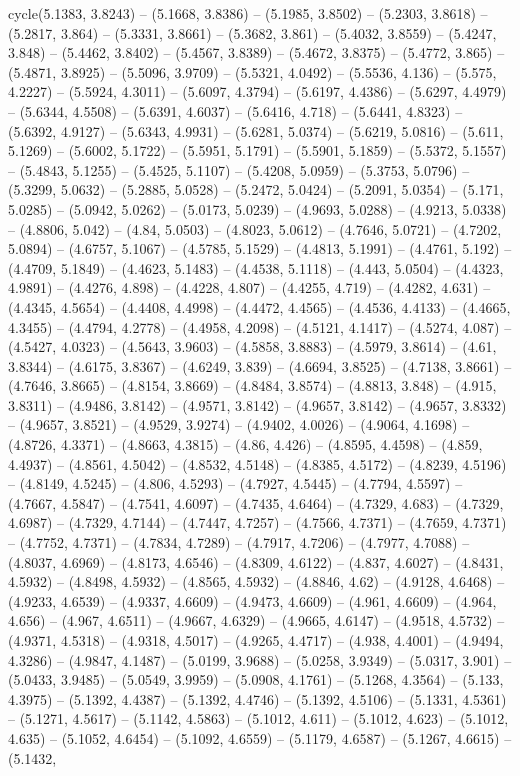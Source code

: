 cycle(5.1383, 3.8243) -- (5.1668, 3.8386) -- (5.1985, 3.8502) -- (5.2303, 3.8618) -- (5.2817, 3.864) -- (5.3331, 3.8661) -- (5.3682, 3.861) -- (5.4032, 3.8559) -- (5.4247, 3.848) -- (5.4462, 3.8402) -- (5.4567, 3.8389) -- (5.4672, 3.8375) -- (5.4772, 3.865) -- (5.4871, 3.8925) -- (5.5096, 3.9709) -- (5.5321, 4.0492) -- (5.5536, 4.136) -- (5.575, 4.2227) -- (5.5924, 4.3011) -- (5.6097, 4.3794) -- (5.6197, 4.4386) -- (5.6297, 4.4979) -- (5.6344, 4.5508) -- (5.6391, 4.6037) -- (5.6416, 4.718) -- (5.6441, 4.8323) -- (5.6392, 4.9127) -- (5.6343, 4.9931) -- (5.6281, 5.0374) -- (5.6219, 5.0816) -- (5.611, 5.1269) -- (5.6002, 5.1722) -- (5.5951, 5.1791) -- (5.5901, 5.1859) -- (5.5372, 5.1557) -- (5.4843, 5.1255) -- (5.4525, 5.1107) -- (5.4208, 5.0959) -- (5.3753, 5.0796) -- (5.3299, 5.0632) -- (5.2885, 5.0528) -- (5.2472, 5.0424) -- (5.2091, 5.0354) -- (5.171, 5.0285) -- (5.0942, 5.0262) -- (5.0173, 5.0239) -- (4.9693, 5.0288) -- (4.9213, 5.0338) -- (4.8806, 5.042) -- (4.84, 5.0503) -- (4.8023, 5.0612) -- (4.7646, 5.0721) -- (4.7202, 5.0894) -- (4.6757, 5.1067) -- (4.5785, 5.1529) -- (4.4813, 5.1991) -- (4.4761, 5.192) -- (4.4709, 5.1849) -- (4.4623, 5.1483) -- (4.4538, 5.1118) -- (4.443, 5.0504) -- (4.4323, 4.9891) -- (4.4276, 4.898) -- (4.4228, 4.807) -- (4.4255, 4.719) -- (4.4282, 4.631) -- (4.4345, 4.5654) -- (4.4408, 4.4998) -- (4.4472, 4.4565) -- (4.4536, 4.4133) -- (4.4665, 4.3455) -- (4.4794, 4.2778) -- (4.4958, 4.2098) -- (4.5121, 4.1417) -- (4.5274, 4.087) -- (4.5427, 4.0323) -- (4.5643, 3.9603) -- (4.5858, 3.8883) -- (4.5979, 3.8614) -- (4.61, 3.8344) -- (4.6175, 3.8367) -- (4.6249, 3.839) -- (4.6694, 3.8525) -- (4.7138, 3.8661) -- (4.7646, 3.8665) -- (4.8154, 3.8669) -- (4.8484, 3.8574) -- (4.8813, 3.848) -- (4.915, 3.8311) -- (4.9486, 3.8142) -- (4.9571, 3.8142) -- (4.9657, 3.8142) -- (4.9657, 3.8332) -- (4.9657, 3.8521) -- (4.9529, 3.9274) -- (4.9402, 4.0026) -- (4.9064, 4.1698) -- (4.8726, 4.3371) -- (4.8663, 4.3815) -- (4.86, 4.426) -- (4.8595, 4.4598) -- (4.859, 4.4937) -- (4.8561, 4.5042) -- (4.8532, 4.5148) -- (4.8385, 4.5172) -- (4.8239, 4.5196) -- (4.8149, 4.5245) -- (4.806, 4.5293) -- (4.7927, 4.5445) -- (4.7794, 4.5597) -- (4.7667, 4.5847) -- (4.7541, 4.6097) -- (4.7435, 4.6464) -- (4.7329, 4.683) -- (4.7329, 4.6987) -- (4.7329, 4.7144) -- (4.7447, 4.7257) -- (4.7566, 4.7371) -- (4.7659, 4.7371) -- (4.7752, 4.7371) -- (4.7834, 4.7289) -- (4.7917, 4.7206) -- (4.7977, 4.7088) -- (4.8037, 4.6969) -- (4.8173, 4.6546) -- (4.8309, 4.6122) -- (4.837, 4.6027) -- (4.8431, 4.5932) -- (4.8498, 4.5932) -- (4.8565, 4.5932) -- (4.8846, 4.62) -- (4.9128, 4.6468) -- (4.9233, 4.6539) -- (4.9337, 4.6609) -- (4.9473, 4.6609) -- (4.961, 4.6609) -- (4.964, 4.656) -- (4.967, 4.6511) -- (4.9667, 4.6329) -- (4.9665, 4.6147) -- (4.9518, 4.5732) -- (4.9371, 4.5318) -- (4.9318, 4.5017) -- (4.9265, 4.4717) -- (4.938, 4.4001) -- (4.9494, 4.3286) -- (4.9847, 4.1487) -- (5.0199, 3.9688) -- (5.0258, 3.9349) -- (5.0317, 3.901) -- (5.0433, 3.9485) -- (5.0549, 3.9959) -- (5.0908, 4.1761) -- (5.1268, 4.3564) -- (5.133, 4.3975) -- (5.1392, 4.4387) -- (5.1392, 4.4746) -- (5.1392, 4.5106) -- (5.1331, 4.5361) -- (5.1271, 4.5617) -- (5.1142, 4.5863) -- (5.1012, 4.611) -- (5.1012, 4.623) -- (5.1012, 4.635) -- (5.1052, 4.6454) -- (5.1092, 4.6559) -- (5.1179, 4.6587) -- (5.1267, 4.6615) -- (5.1432, 